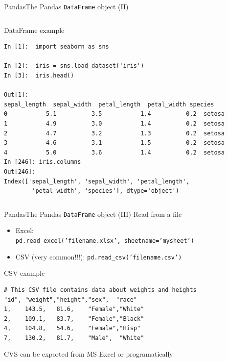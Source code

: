\documentclass[10pt,compress]{beamer} %
\begin{document}
\begin{frame}[fragile]{Pandas}{The Pandas \texttt{DataFrame} object (II)}
	\begin{columns}
	   \column{\textwidth}
		\begin{exampleblock}{\footnotesize{DataFrame example}}
		\vspace{-0.2cm} 
			\begin{lstlisting}
In [1]:  import seaborn as sns

In [2]:  iris = sns.load_dataset('iris')
In [3]:  iris.head()

Out[1]:
sepal_length  sepal_width  petal_length  petal_width species
0           5.1          3.5           1.4          0.2  setosa
1           4.9          3.0           1.4          0.2  setosa
2           4.7          3.2           1.3          0.2  setosa
3           4.6          3.1           1.5          0.2  setosa
4           5.0          3.6           1.4          0.2  setosa
In [246]: iris.columns
Out[246]: 
Index(['sepal_length', 'sepal_width', 'petal_length', 
        'petal_width', 'species'], dtype='object')
\end{lstlisting}
\vspace{-0.2cm} 
		\end{exampleblock}
	\end{columns}
\end{frame}

\begin{frame}[fragile]{Pandas}{The Pandas \texttt{DataFrame} object (III)}
	Read from a file
	\begin{itemize}
		\item Excel:\\
		\texttt{pd.read\_excel('filename.xlsx', sheetname='mysheet')}
		\item CSV (very common!!!): \texttt{pd.read\_csv('filename.csv')}
	\end{itemize}

	\begin{exampleblock}{CSV example}
		\begin{lstlisting}
# This CSV file contains data about weights and heights
"id", "weight","height","sex",  "race"
1,    143.5,   81.6,    "Female","White"
2,    109.1,   83.7,    "Female","Black"
4,    104.8,   54.6,    "Female","Hisp"
7,    130.2,   81.7,    "Male",  "White"
\end{lstlisting}
	\end{exampleblock}
	CVS can be exported from MS Excel or programatically
\end{frame}
\end{document}
